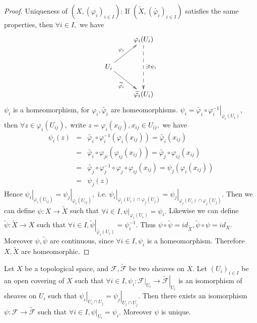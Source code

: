 \begin{proof}
Uniqueness of $(X,(\varphi_i)_{i\in I})$: If
$(\widetilde{X},(\widetilde{\varphi_i})_{i\in I})$ satisfies the
same properties, then $\forall i\in I,$ we have
\[ \xymatrix{
   & {\varphi_i(U_i)} \ar@{-->}[dd]^-{\exists ! \psi_i}   \\
   U_i \ar[ur]^-{\varphi_i} \ar[dr]_-{\widetilde{\varphi_i}}  \\
   & {\widetilde{\varphi_i}(U_i)} }  \]
$\psi_i$ is a homeomorphism, for $\varphi_i, \widetilde{\varphi_i}$
are homeomorphisms. $\psi_i =
\left.\widetilde{\varphi_i}\circ\varphi_i^{-1}\right|_{\varphi_i(U_i)},$
then $\forall z\in\varphi_i(U_{ij}),$ write $z=\varphi_i(x_{ij}),
x_{ij}\in U_{ij},$ we have
\begin{eqnarray*}
\psi_i(z) & = &
\widetilde{\varphi_i}\circ\varphi_i^{-1}(\varphi_i(x_{ij}))=\widetilde{\varphi_i}(x_{ij})\\
          & = &
          \widetilde{\varphi_i}\circ\varphi_{ji}(\varphi_{ij}(x_{ij}))=\widetilde{\varphi_j}\circ\varphi_{ij}(x_{ij})\\
          & = &
          \widetilde{\varphi_j}\circ\varphi_j^{-1}\circ\varphi_j\circ\varphi_{ij}(x_{ij})=\psi_j(\varphi_i(x_{ij}))\\
          & = & \psi_j(z)
\end{eqnarray*}
Hence $\left.\psi_i\right|_{\varphi_i(U_{ij})} =
\left.\psi_j\right|_{\varphi_i(U_{ij})},$ i.e.
$\left.\psi_i\right|_{\varphi_i(U_i)\cap\varphi_j(U_j)} =
\left.\psi_j\right|_{\varphi_i(U_i)\cap\varphi_j(U_j)}.$ Then we can
define $\psi: X\rightarrow\widetilde{X}$ such that $\forall i\in I,
\left.\psi\right|_{\varphi_i(U_i)}=\psi_i.$ Likewise we can define
$\widetilde{\psi}: \widetilde{X}\rightarrow X$ such that $\forall
i\in I,
\left.\widetilde{\psi}\right|_{\widetilde{\varphi_i}(U_i)}=\psi_i^{-1}.$
Thus $\psi\circ\widetilde{\psi}=id_{\widetilde{X}},
\widetilde{\psi}\circ\psi=id_X.$ Moreover $\psi, \widetilde{\psi}$
are continuous, since $\forall i\in I, \psi_i$ is a homeomorphism.
Therefore $X, \widetilde{X}$ are homeomorphic.
\end{proof}
\begin{prop}
Let $X$ be a topological space, and $\mathscr{F},
\widetilde{\mathscr{F}}$ be two sheaves on $X.$ Let $(U_i)_{i\in I}$
be an open covering of $X$ such that $\forall i\in I,\psi_i:
\left.\mathscr{F}\right|_{U_i}\rightarrow
\left.\widetilde{\mathscr{F}}\right|_{U_i}$ is an isomorphism of
sheaves on $U_i$ such that $\left.\psi_i\right|_{U_i\cap
U_j}=\left.\psi_j\right|_{U_i\cap U_j}.$ Then there exists an
isomorphism $\psi: \mathscr{F}\rightarrow \widetilde{\mathscr{F}}$
such that $\forall i\in I, \left.\psi\right|_{U_i}=\psi_i.$ Moreover
$\psi$ is unique.
\end{prop}
